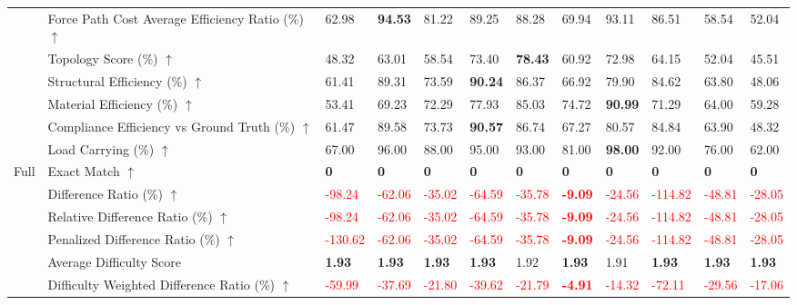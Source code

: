 \begin{table}[!h]
{\begin{tabular}{llllllllllll}
 & Force Path Cost Average Efficiency Ratio (\%) $\uparrow$ & 62.98 & \textbf{94.53} & 81.22 & 89.25 & 88.28 & 69.94 & 93.11 & 86.51 & 58.54 & 52.04 \\
 & Topology Score (\%) $\uparrow$ & 48.32 & 63.01 & 58.54 & 73.40 & \textbf{78.43} & 60.92 & 72.98 & 64.15 & 52.04 & 45.51 \\
 & Structural Efficiency (\%) $\uparrow$ & 61.41 & 89.31 & 73.59 & \textbf{90.24} & 86.37 & 66.92 & 79.90 & 84.62 & 63.80 & 48.06 \\
 & Material Efficiency (\%) $\uparrow$ & 53.41 & 69.23 & 72.29 & 77.93 & 85.03 & 74.72 & \textbf{90.99} & 71.29 & 64.00 & 59.28 \\
 & Compliance Efficiency vs Ground Truth (\%) $\uparrow$ & 61.47 & 89.58 & 73.73 & \textbf{90.57} & 86.74 & 67.27 & 80.57 & 84.84 & 63.90 & 48.32 \\
 & Load Carrying (\%) $\uparrow$ & 67.00 & 96.00 & 88.00 & 95.00 & 93.00 & 81.00 & \textbf{98.00} & 92.00 & 76.00 & 62.00 \\
Full & Exact Match $\uparrow$ & \textbf{0} & \textbf{0} & \textbf{0} & \textbf{0} & \textbf{0} & \textbf{0} & \textbf{0} & \textbf{0} & \textbf{0} & \textbf{0} \\
 & Difference Ratio (\%) $\uparrow$ & \textcolor{red}{-98.24} & \textcolor{red}{-62.06} & \textcolor{red}{-35.02} & \textcolor{red}{-64.59} & \textcolor{red}{-35.78} & \textbf{\textcolor{red}{-9.09}} & \textcolor{red}{-24.56} & \textcolor{red}{-114.82} & \textcolor{red}{-48.81} & \textcolor{red}{-28.05} \\
 & Relative Difference Ratio (\%) $\uparrow$ & \textcolor{red}{-98.24} & \textcolor{red}{-62.06} & \textcolor{red}{-35.02} & \textcolor{red}{-64.59} & \textcolor{red}{-35.78} & \textbf{\textcolor{red}{-9.09}} & \textcolor{red}{-24.56} & \textcolor{red}{-114.82} & \textcolor{red}{-48.81} & \textcolor{red}{-28.05} \\
 & Penalized Difference Ratio (\%) $\uparrow$ & \textcolor{red}{-130.62} & \textcolor{red}{-62.06} & \textcolor{red}{-35.02} & \textcolor{red}{-64.59} & \textcolor{red}{-35.78} & \textbf{\textcolor{red}{-9.09}} & \textcolor{red}{-24.56} & \textcolor{red}{-114.82} & \textcolor{red}{-48.81} & \textcolor{red}{-28.05} \\
 & Average Difficulty Score & \textbf{1.93} & \textbf{1.93} & \textbf{1.93} & \textbf{1.93} & 1.92 & \textbf{1.93} & 1.91 & \textbf{1.93} & \textbf{1.93} & \textbf{1.93} \\
 & Difficulty Weighted Difference Ratio (\%) $\uparrow$ & \textcolor{red}{-59.99} & \textcolor{red}{-37.69} & \textcolor{red}{-21.80} & \textcolor{red}{-39.62} & \textcolor{red}{-21.79} & \textbf{\textcolor{red}{-4.91}} & \textcolor{red}{-14.32} & \textcolor{red}{-72.11} & \textcolor{red}{-29.56} & \textcolor{red}{-17.06} \\

\end{tabular}}
\end{table}
